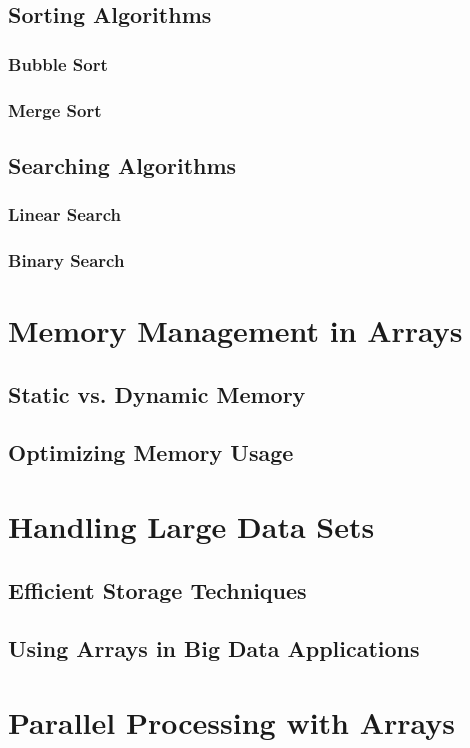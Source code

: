 \documentclass[12pt, oneside]{book}
\begin{document}
	\subsection{Sorting Algorithms}
	\subsubsection{Bubble Sort}
	\subsubsection{Merge Sort}
	\subsection{Searching Algorithms}
	\subsubsection{Linear Search}
	\subsubsection{Binary Search}
	
	\section{Memory Management in Arrays}
	\subsection{Static vs. Dynamic Memory}
	\subsection{Optimizing Memory Usage}
	
	\section{Handling Large Data Sets}
	\subsection{Efficient Storage Techniques}
	\subsection{Using Arrays in Big Data Applications}
	
	\section{Parallel Processing with Arrays}
\end{document}
